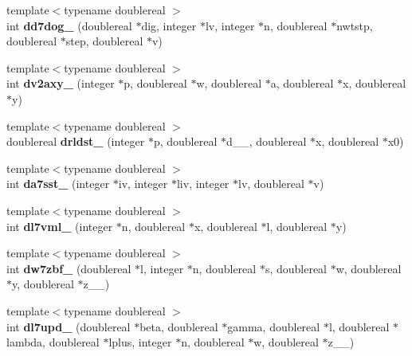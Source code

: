 \begin{DoxyCompactItemize}
\item 
\hypertarget{namespaceport_aba7ca649dcf8b30acb492366b800667d}{{\footnotesize template$<$typename doublereal $>$ }\\int {\bfseries dd7dog\+\_\+} (doublereal $\ast$dig, integer $\ast$lv, integer $\ast$n, doublereal $\ast$nwtstp, doublereal $\ast$step, doublereal $\ast$v)}\label{namespaceport_aba7ca649dcf8b30acb492366b800667d}

\item 
\hypertarget{namespaceport_ad4192ba2fc683890d02a9833623602f0}{{\footnotesize template$<$typename doublereal $>$ }\\int {\bfseries dv2axy\+\_\+} (integer $\ast$p, doublereal $\ast$w, doublereal $\ast$a, doublereal $\ast$x, doublereal $\ast$y)}\label{namespaceport_ad4192ba2fc683890d02a9833623602f0}

\item 
\hypertarget{namespaceport_a82866218188b12620da326ea8cfb13ba}{{\footnotesize template$<$typename doublereal $>$ }\\doublereal {\bfseries drldst\+\_\+} (integer $\ast$p, doublereal $\ast$d\+\_\+\+\_\+, doublereal $\ast$x, doublereal $\ast$x0)}\label{namespaceport_a82866218188b12620da326ea8cfb13ba}

\item 
\hypertarget{namespaceport_ab03c09966498721f6c724e4b5dfcb929}{{\footnotesize template$<$typename doublereal $>$ }\\int {\bfseries da7sst\+\_\+} (integer $\ast$iv, integer $\ast$liv, integer $\ast$lv, doublereal $\ast$v)}\label{namespaceport_ab03c09966498721f6c724e4b5dfcb929}

\item 
\hypertarget{namespaceport_aa80a72e3103cc9d6d7fbe0cd60751d88}{{\footnotesize template$<$typename doublereal $>$ }\\int {\bfseries dl7vml\+\_\+} (integer $\ast$n, doublereal $\ast$x, doublereal $\ast$l, doublereal $\ast$y)}\label{namespaceport_aa80a72e3103cc9d6d7fbe0cd60751d88}

\item 
\hypertarget{namespaceport_a803d653cf84176f7aac38c03adac3e23}{{\footnotesize template$<$typename doublereal $>$ }\\int {\bfseries dw7zbf\+\_\+} (doublereal $\ast$l, integer $\ast$n, doublereal $\ast$s, doublereal $\ast$w, doublereal $\ast$y, doublereal $\ast$z\+\_\+\+\_\+)}\label{namespaceport_a803d653cf84176f7aac38c03adac3e23}

\item 
\hypertarget{namespaceport_a2999999e4c285034d65cc2c18a568a39}{{\footnotesize template$<$typename doublereal $>$ }\\int {\bfseries dl7upd\+\_\+} (doublereal $\ast$beta, doublereal $\ast$gamma, doublereal $\ast$l, doublereal $\ast$lambda, doublereal $\ast$lplus, integer $\ast$n, doublereal $\ast$w, doublereal $\ast$z\+\_\+\+\_\+)}\label{namespaceport_a2999999e4c285034d65cc2c18a568a39}


\end{DoxyCompactItemize}
